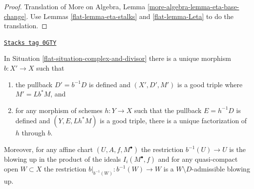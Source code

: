 \begin{proof}

Translation of
More on Algebra, Lemma \ref{more-algebra-lemma-eta-base-change}.
Use Lemmas \ref{flat-lemma-eta-stalks} and \ref{flat-lemma-Leta}
to do the translation.
\end{proof}

\begin{lemma}
\label{flat-lemma-complex-and-divisor-blowup-pre}
\href{https://stacks.math.columbia.edu/tag/0GTY}{\texttt{Stacks tag 0GTY}}

In Situation \ref{flat-situation-complex-and-divisor}
there is a unique morphism $b : X' \to X$ such that
\begin{enumerate}
\item the pullback $D' = b^{-1}D$ is defined and
$(X', D', M')$ is a good triple where $M' = Lb^*M$, and
\item for any morphism of schemes $h : Y \to X$ such that
the pullback $E = h^{-1}D$ is defined and $(Y, E, Lh^*M)$
is a good triple, there is a unique factorization of $h$ through $b$.
\end{enumerate}
Moreover, for any affine chart $(U, A, f, M^\bullet)$ the restriction
$b^{-1}(U) \to U$ is the blowing up in the product of the ideals
$I_i(M^\bullet, f)$ and for any quasi-compact open $W \subset X$ the
restriction $b|_{b^{-1}(W)} : b^{-1}(W) \to W$ is a $W \setminus D$-admissible
blowing up.
\end{lemma}

